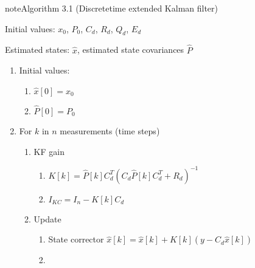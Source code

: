 \label{04.01_EK:ek-algorithm}
\begin{sphinxadmonition}{note}{Algorithm 3.1 (Discrete\sphinxhyphen{}time extended Kalman filter)}




 Initial values: \(x_0\), \(P_0\), \(C_d\), \(R_d\), \(Q_d\), \(E_d\)


 Estimated states: \(\hat{x}\), estimated state covariances \(\hat{P}\)
\begin{enumerate}
%
\item {} 

Initial values:
\begin{enumerate}
%
\item {} 

\(\hat{x}[0] = x_0\)

\item {} 

\(\hat{P}[0] = P_0\)

\end{enumerate}

\item {} 

For \(k\) in \(n\) measurements (time steps)
\begin{enumerate}
%
\item {} 

KF gain
\begin{enumerate}
%
\item {} 

\(K[k]=\hat{P}[k] C_d^T \left(C_d \hat{P}[k] C_d^T + R_d\right)^{-1}\)

\item {} 

\(I_{KC} = I_n - K[k] C_d\)

\end{enumerate}

\item {} 

Update
\begin{enumerate}
%
\item {} 

State corrector
\(\hat{x}[k] = \hat{x}[k] + K[k] (y - C_d \hat{x}[k]) \)

\item {} 


\end{enumerate}
\end{enumerate}
\end{enumerate}
\end{sphinxadmonition}
